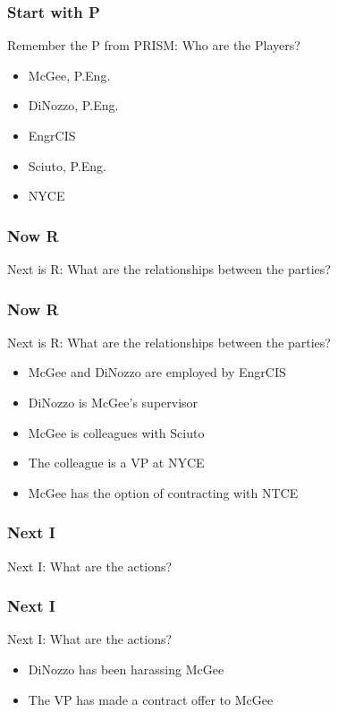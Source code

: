 \begin{frame}
\frametitle{Start with P}

Remember the P from PRISM: Who are the Players?

\begin{itemize}
	\item McGee, P.Eng.
	\item DiNozzo, P.Eng.
	\item EngrCIS
	\item Sciuto, P.Eng.
	\item NYCE
\end{itemize}


\end{frame}



\begin{frame}
\frametitle{Now R}

Next is R:  What are the relationships between the parties? 


\end{frame}

\begin{frame}
\frametitle{Now R}

Next is R:  What are the relationships between the parties? 

\begin{itemize}
	\item McGee  and DiNozzo are employed by EngrCIS
	\item DiNozzo is McGee's supervisor 
	\item McGee is colleagues with Sciuto
	\item The colleague is a VP at NYCE
	\item McGee has the option of contracting with NTCE
\end{itemize}


\end{frame}

\begin{frame}
\frametitle{Next I}

Next I: What are the actions?


\end{frame}

\begin{frame}
\frametitle{Next I}

Next I: What are the actions?

\begin{itemize}
	\item DiNozzo has been harassing McGee
	\item The VP has made a contract offer to McGee
\end{itemize}

\end{frame}



